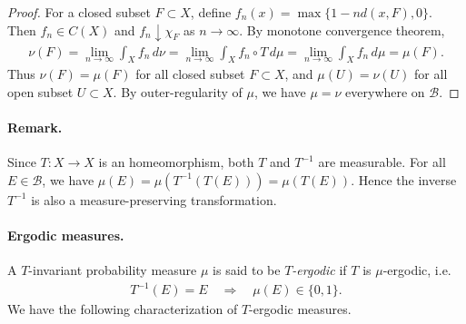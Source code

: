\documentclass{article}
\numberwithin{equation}{section}
\newcommand{\scr}{\mathscr}
\theoremstyle{plain}
\theoremstyle{definition}
\begin{document}
\begin{proof}
For a closed subset $F\subset X$, define $f_n(x)=\max\{1-nd(x,F),0\}$. Then $f_n\in C(X)$ and $f_n\downarrow\chi_F$ as $n\to\infty$. By monotone convergence theorem,
\begin{align*}
	\nu(F)=\lim_{n\to\infty} \int_Xf_n\,d\nu=\lim_{n\to\infty} \int_X f_n\circ T\,d\mu=\lim_{n\to\infty}\int_Xf_n\,d\mu=\mu(F).
\end{align*}
Thus $\nu(F)=\mu(F)$ for all closed subset $F\subset X$, and $\mu(U)=\nu(U)$ for all open subset $U\subset X$. By outer-regularity of $\mu$, we have $\mu=\nu$ everywhere on $\scr{B}$.
\end{proof}
\paragraph{Remark.} Since $T:X\to X$ is an homeomorphism, both $T$ and $T^{-1}$ are measurable. For all $E\in\scr{B}$, we have $\mu(E)=\mu(T^{-1}(T(E)))=\mu(T(E))$. Hence the inverse $T^{-1}$ is also a measure-preserving transformation.

\paragraph{Ergodic measures.} A $T$-invariant probability measure $\mu$ is said to be \textit{$T$-ergodic} if $T$ is $\mu$-ergodic, i.e.
\begin{align*}
	T^{-1}(E)=E\quad\Rightarrow\quad\mu(E)\in\{0,1\}.
\end{align*}
We have the following characterization of $T$-ergodic measures.
\end{document}
